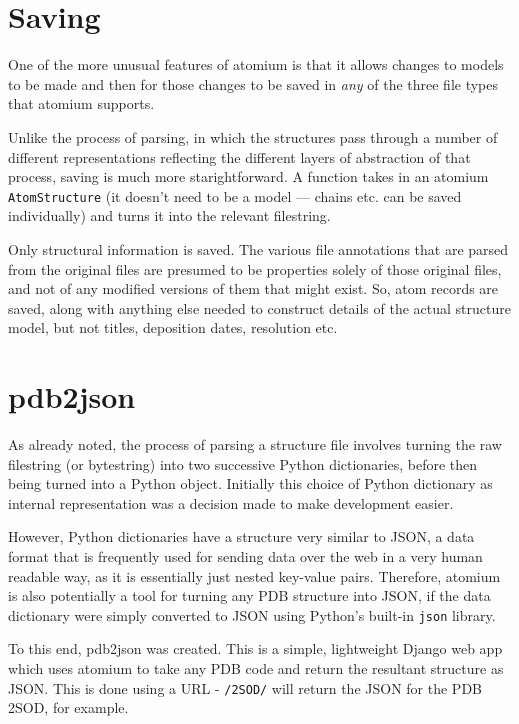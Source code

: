 \section{Saving}

One of the more unusual features of atomium is that it allows changes to models to be made and then for those changes to be saved in \emph{any} of the three file types that atomium supports.

Unlike the process of parsing, in which the structures pass through a number of different representations reflecting the different layers of abstraction of that process, saving is much more starightforward. A function takes in an atomium \texttt{AtomStructure} (it doesn't need to be a model --- chains etc. can be saved individually) and turns it into the relevant filestring.

Only structural information is saved. The various file annotations that are parsed from the original files are presumed to be properties solely of those original files, and not of any modified versions of them that might exist. So, atom records are saved, along with anything else needed to construct details of the actual structure model, but not titles, deposition dates, resolution etc.

\section{pdb2json}

As already noted, the process of parsing a structure file involves turning the raw filestring (or bytestring) into two successive Python dictionaries, before then being turned into a Python object. Initially this choice of Python dictionary as internal representation was a decision made to make development easier.

However, Python dictionaries have a structure very similar to JSON, a data format that is frequently used for sending data over the web in a very human readable way, as it is essentially just nested key-value pairs. Therefore, atomium is also potentially a tool for turning any PDB structure into JSON, if the data dictionary were simply converted to JSON using Python's built-in \texttt{json} library.

To this end, pdb2json was created. This is a simple, lightweight Django web app which uses atomium to take any PDB code and return the resultant structure as JSON. This is done using a URL - \texttt{/2SOD/} will return the JSON for the PDB 2SOD, for example.

